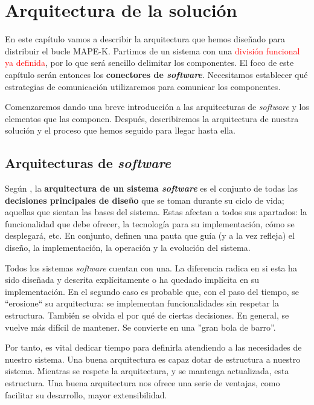 \chapter{Arquitectura de la solución}

En este capítulo vamos a describir la arquitectura que hemos diseñado para distribuir el bucle MAPE-K. Partimos de un sistema con una \textcolor{red}{división funcional ya definida}, por lo que será sencillo delimitar los componentes. El foco de este capítulo serán entonces los \textbf{conectores de \emph{software}}. Necesitamos establecer qué estrategias de comunicación utilizaremos para comunicar los componentes.

Comenzaremos dando una breve introducción a las arquitecturas de \emph{software} y los elementos que las componen. Después, describiremos la arquitectura de nuestra solución y el proceso que hemos seguido para llegar hasta ella.

\section{Arquitecturas de \emph{software}}

Según \cite{taylorSoftwareArchitectureFoundations2009}, la \textbf{arquitectura de un sistema \emph{software}} es el conjunto de todas las \textbf{decisiones principales de diseño} que se toman durante su ciclo de vida; aquellas que sientan las bases del sistema. Estas afectan a todos sus apartados: la funcionalidad que debe ofrecer, la tecnología para su implementación, cómo se desplegará, etc. En conjunto, definen una pauta que guía (y a la vez refleja) el diseño, la implementación, la operación y la evolución del sistema.

Todos los sistemas \emph{software} cuentan con una. La diferencia radica en si esta ha sido diseñada y descrita explícitamente o ha quedado implícita en su implementación. \cite{taylorSoftwareArchitectureFoundations2009} En el segundo caso es probable que, con el paso del tiempo, se ``erosione`` su arquitectura: se implementan funcionalidades sin respetar la estructura. También se olvida el por qué de ciertas decisiones. En general, se vuelve más difícil de mantener. Se convierte en una ''gran bola de barro''. \cite{footeBigBallMud1997}

Por tanto, es vital dedicar tiempo para definirla atendiendo a las necesidades de nuestro sistema. Una buena arquitectura es capaz dotar de estructura a nuestro sistema. \cite{martinCleanArchitectureCraftsman2018} Mientras se respete la arquitectura, y se mantenga actualizada, esta estructura. Una buena arquitectura nos ofrece una serie de ventajas, como facilitar su desarrollo, mayor extensibilidad.

